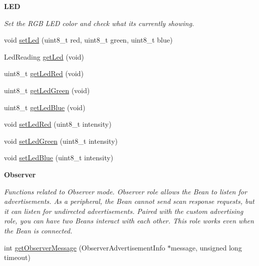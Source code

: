 \begin{Indent}{\bf L\+E\+D}\par
{\em Set the R\+G\+B L\+E\+D color and check what it\textquotesingle{}s currently showing. }\begin{DoxyCompactItemize}
\item 
void \hyperlink{class_bean_class_a7af1f9d1edb112f761db9b69686b5a5a}{set\+Led} (uint8\+\_\+t red, uint8\+\_\+t green, uint8\+\_\+t blue)
\item 
Led\+Reading \hyperlink{class_bean_class_ab73794fbf27d0297ead453ca60ac4aaf}{get\+Led} (void)
\item 
uint8\+\_\+t \hyperlink{class_bean_class_aea8736bf91c03de609233ddb270fb77d}{get\+Led\+Red} (void)
\item 
uint8\+\_\+t \hyperlink{class_bean_class_a5619292a562731e94f97e93432ab3639}{get\+Led\+Green} (void)
\item 
uint8\+\_\+t \hyperlink{class_bean_class_a8dcd68a87dc75dd0fe912483cc05fa43}{get\+Led\+Blue} (void)
\item 
void \hyperlink{class_bean_class_adfc2642320c53819c83bbaa59bbcef9b}{set\+Led\+Red} (uint8\+\_\+t intensity)
\item 
void \hyperlink{class_bean_class_ae1955c0312d1fa90bfeb847dada48c8c}{set\+Led\+Green} (uint8\+\_\+t intensity)
\item 
void \hyperlink{class_bean_class_ac09c0f3cea6025e2e12e8b6c5419434b}{set\+Led\+Blue} (uint8\+\_\+t intensity)
\end{DoxyCompactItemize}
\end{Indent}
\begin{Indent}{\bf Observer}\par
{\em Functions related to Observer mode. Observer role allows the Bean to listen for advertisements. As a peripheral, the Bean cannot send scan response requests, but it can listen for undirected advertisements. Paired with the custom advertising role, you can have two Beans interact with each other. This role works even when the Bean is connected. }\begin{DoxyCompactItemize}
\item 
int \hyperlink{class_bean_class_a5aa91cc9c0a3e17da864978845735ded}{get\+Observer\+Message} (Observer\+Advertisement\+Info $\ast$message, unsigned long timeout)
\end{DoxyCompactItemize}
\end{Indent}
